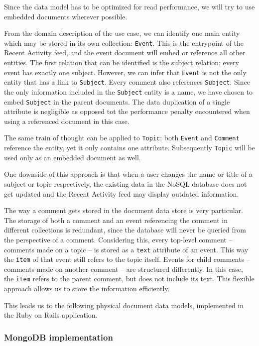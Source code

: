 Since the data model has to be optimized for read performance, we will try to use embedded documents wherever possible.

From the domain description of the use case, we can identify one main entity which may be stored in its own collection: \texttt{Event}.
This is the entrypoint of the Recent Activity feed, and the event document will embed or reference all other entities.
The first relation that can be identified is the subject relation: every event has exactly one subject.
However, we can infer that \texttt{Event} is not the only entity that has a link to \texttt{Subject}.
Every comment also references \texttt{Subject}.
Since the only information included in the \texttt{Subject} entity is a name, we have chosen to embed \texttt{Subject} in the parent documents.
The data duplication of a single attribute is negligible as opposed tot the performance penalty encountered when using a referenced document in this case.

The same train of thought can be applied to \texttt{Topic}: both \texttt{Event} and \texttt{Comment} reference the entity, yet it only contains one attribute.
Subsequently \texttt{Topic} will be used only as an embedded document as well.

One  downside of this approach is that when a user changes the name or title of a subject or topic respectively, the existing data in the NoSQL database does not get updated and the Recent Activity feed may display outdated information.

The way a comment gets stored in the document data store is very particular.
The storage of both a comment and an event referencing the comment in different collections is redundant, since the database will never be queried from the perspective of a comment.
Considering this, every top-level comment -- comments made on a topic -- is stored as a \texttt{text} attribute of an event.
This way the \texttt{item} of that event still refers to the topic itself.
Events for child comments -- comments made on another comment -- are structured differently.
In this case, the \texttt{item} refers to the parent comment, but does not include its text.
This flexible approach allows us to store the information efficiently.

This leads us to the following physical document data models, implemented in the Ruby on Rails application.

\subsubsection{MongoDB implementation}
\label{subsubsec:mongodb-implementation}

